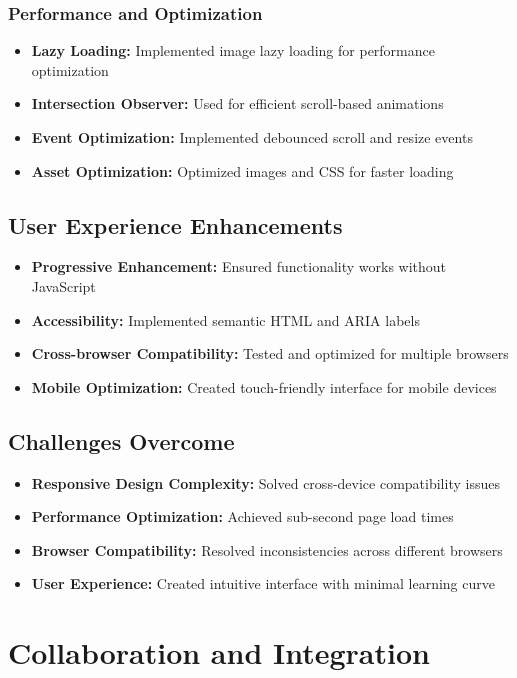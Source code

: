 \documentclass[12pt,a4paper]{report}
\begin{document}
\subsubsection{Performance and Optimization}
\begin{itemize}
    \item \textbf{Lazy Loading:} Implemented image lazy loading for performance optimization
    \item \textbf{Intersection Observer:} Used for efficient scroll-based animations
    \item \textbf{Event Optimization:} Implemented debounced scroll and resize events
    \item \textbf{Asset Optimization:} Optimized images and CSS for faster loading
\end{itemize}

\subsection{User Experience Enhancements}
\begin{itemize}
    \item \textbf{Progressive Enhancement:} Ensured functionality works without JavaScript
    \item \textbf{Accessibility:} Implemented semantic HTML and ARIA labels
    \item \textbf{Cross-browser Compatibility:} Tested and optimized for multiple browsers
    \item \textbf{Mobile Optimization:} Created touch-friendly interface for mobile devices
\end{itemize}

\subsection{Challenges Overcome}
\begin{itemize}
    \item \textbf{Responsive Design Complexity:} Solved cross-device compatibility issues
    \item \textbf{Performance Optimization:} Achieved sub-second page load times
    \item \textbf{Browser Compatibility:} Resolved inconsistencies across different browsers
    \item \textbf{User Experience:} Created intuitive interface with minimal learning curve
\end{itemize}

\section{Collaboration and Integration}
\end{document}
